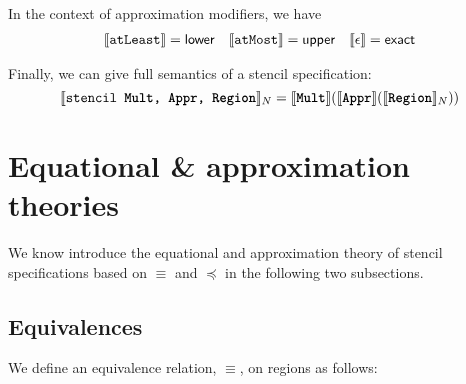 \documentclass[acmlarge,review]{acmart}
\theoremstyle{definition}
\theoremstyle{plain}
\theoremstyle{remark}
\begin{document}
In the context of approximation modifiers, we have
%
\begin{align*}
  \llbracket{} {\texttt{atLeast}} \rrbracket{} & = \mathsf{lower} &
  \llbracket{} {\texttt{atMost}} \rrbracket{} & = \mathsf{upper} &
  \llbracket \epsilon \rrbracket = \mathsf{exact}
\end{align*}

Finally, we can give full semantics of a stencil specification:
%
\begin{equation*}
  \llbracket{} {\texttt{stencil \texttt{\textbf{Mult}}, \texttt{\textbf{Appr}}, \texttt{\textbf{Region}}}} \rrbracket{}_N =
    \llbracket{} {\texttt{\textbf{Mult}}} \rrbracket{}
           {(\llbracket{} {\texttt{\textbf{Appr}}} \rrbracket{}
                    {(\llbracket{} {\texttt{\textbf{Region}}} \rrbracket{}_N)})}
\end{equation*}

\section{Equational \& approximation theories}

We know introduce the equational and approximation theory of stencil
specifications based on $\equiv$ and $\preceq$ in the following two subsections.

\subsection{Equivalences}

We define an equivalence relation, $\equiv$, on regions as follows:
\end{document}
